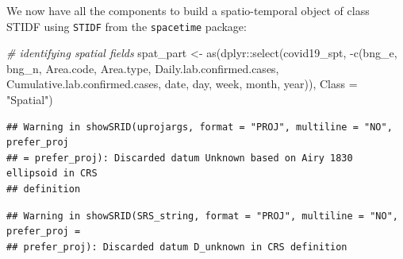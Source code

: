 \documentclass[
]{book}
\newenvironment{Shaded}{\begin{snugshade}}{\end{snugshade}}
\newcommand{\AttributeTok}[1]{\textcolor[rgb]{0.77,0.63,0.00}{#1}}
\newcommand{\CommentTok}[1]{\textcolor[rgb]{0.56,0.35,0.01}{\textit{#1}}}
\newcommand{\FunctionTok}[1]{\textcolor[rgb]{0.00,0.00,0.00}{#1}}
\newcommand{\NormalTok}[1]{#1}
\newcommand{\OtherTok}[1]{\textcolor[rgb]{0.56,0.35,0.01}{#1}}
\newcommand{\SpecialCharTok}[1]{\textcolor[rgb]{0.00,0.00,0.00}{#1}}
\newcommand{\StringTok}[1]{\textcolor[rgb]{0.31,0.60,0.02}{#1}}
\begin{document}
We now have all the components to build a spatio-temporal object of class STIDF using \texttt{STIDF} from the \texttt{spacetime} package:

\begin{Shaded}
\begin{Highlighting}[]
\CommentTok{\# identifying spatial fields}
\NormalTok{spat\_part }\OtherTok{\textless{}{-}} \FunctionTok{as}\NormalTok{(dplyr}\SpecialCharTok{::}\FunctionTok{select}\NormalTok{(covid19\_spt, }\SpecialCharTok{{-}}\FunctionTok{c}\NormalTok{(bng\_e, bng\_n, Area.code, Area.type, Daily.lab.confirmed.cases, Cumulative.lab.confirmed.cases, date, day, week, month, year)), }\AttributeTok{Class =} \StringTok{"Spatial"}\NormalTok{)}
\end{Highlighting}
\end{Shaded}

\begin{verbatim}
## Warning in showSRID(uprojargs, format = "PROJ", multiline = "NO", prefer_proj
## = prefer_proj): Discarded datum Unknown based on Airy 1830 ellipsoid in CRS
## definition
\end{verbatim}

\begin{verbatim}
## Warning in showSRID(SRS_string, format = "PROJ", multiline = "NO", prefer_proj =
## prefer_proj): Discarded datum D_unknown in CRS definition
\end{verbatim}

\begin{Shaded}
\end{Shaded}
\end{document}
